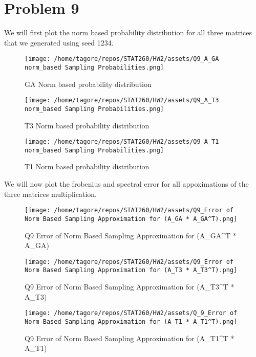 \documentclass{article}
\begin{document}
\section*{Problem 9}
We will first plot the norm based probability distribution for all three matrices that we generated using seed 1234.
\begin{figure}
    \centering
    \texttt{[image: /home/tagore/repos/STAT260/HW2/assets/Q9\_A\_GA norm\_based Sampling Probabilities.png]}
    \caption{GA Norm based probability distribution}
    \label{fig:GA_norm_based_prob}
\end{figure}
\begin{figure}
    \centering
    \texttt{[image: /home/tagore/repos/STAT260/HW2/assets/Q9\_A\_T3 norm\_based Sampling Probabilities.png]}
    \caption{T3 Norm based probability distribution}
    \label{fig:T3_norm_based_prob}
\end{figure}
\begin{figure}
    \centering
    \texttt{[image: /home/tagore/repos/STAT260/HW2/assets/Q9\_A\_T1 norm\_based Sampling Probabilities.png]}
    \caption{T1 Norm based probability distribution}
    \label{fig:T1_norm_based_prob}
\end{figure}

We will now plot the frobenius and spectral error for all appoximations of the three matrices multiplication.
\begin{figure}
    \centering
    \texttt{[image: /home/tagore/repos/STAT260/HW2/assets/Q9\_Error of Norm Based Sampling Approximation for (A\_GA * A\_GA^T).png]}
    \caption{Q9 Error of Norm Based Sampling Approximation for (A\_GA\textasciicircum T * A\_GA)}
    \label{fig:T1_norm_based_prob}
\end{figure}
\begin{figure}
    \centering
    \texttt{[image: /home/tagore/repos/STAT260/HW2/assets/Q9\_Error of Norm Based Sampling Approximation for (A\_T3 * A\_T3^T).png]}
    \caption{Q9 Error of Norm Based Sampling Approximation for (A\_T3\textasciicircum T * A\_T3)}
    \label{fig:T1_norm_based_prob}
\end{figure}
\begin{figure}
    \centering
    \texttt{[image: /home/tagore/repos/STAT260/HW2/assets/Q\_9\_Error of Norm Based Sampling Approximation for (A\_T1 * A\_T1^T).png]}
    \caption{Q9 Error of Norm Based Sampling Approximation for (A\_T1\textasciicircum T * A\_T1)}
    \label{fig:T1_norm_based_prob}
\end{figure}
\end{document}
